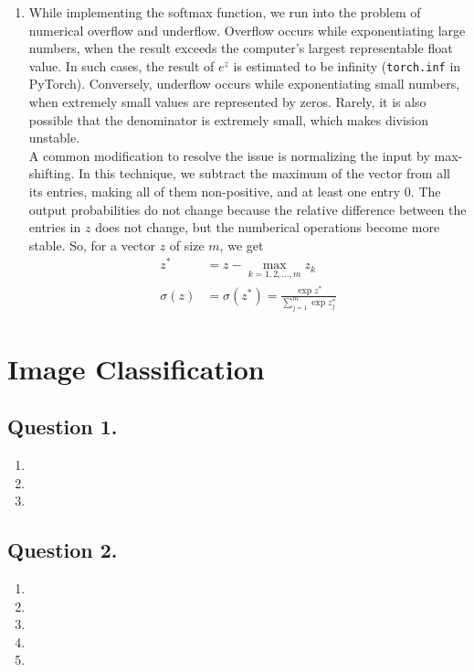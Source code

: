 \documentclass[10pt]{article}
\begin{document}
\begin{enumerate}[label=(\alph*)]
        \item While implementing the softmax function, we run into the problem of numerical overflow
        and underflow. Overflow occurs while exponentiating large numbers, when the result exceeds the
        computer's largest representable float value. In such cases, the result of $e^{z}$ is estimated to be
        infinity (\texttt{torch.inf} in PyTorch). Conversely, underflow occurs while exponentiating small
        numbers, when extremely small values are represented by zeros. Rarely, it is also possible
        that the denominator is extremely small, which makes division unstable. \\
        A common modification to resolve the issue is normalizing the input by max-shifting. In this
        technique, we subtract the maximum of the vector from all its entries, making all of them
        non-positive, and at least one entry 0. The output probabilities do not change because the relative
        difference between the entries in $z$ does not change, but the numberical
        operations become more stable. So, for a vector $z$ of size $m$, we get
        \begin{align*}
            z^{*} &= z - \max_{k = 1, 2, \dots, m}{z_{k}} \\
            \sigma(z) &= \sigma(z^{*}) = \frac{\exp{z^{*}}}{\sum_{j=1}^{m} \exp{z_{j}^{*}}}
        \end{align*}
    \end{enumerate}

    \section*{\textbf{Image Classification}}

    \subsection*{\textbf{Question 1.}}
    \begin{enumerate}[label=(\alph*)]
        \item
        \item
        \item
    \end{enumerate}

    \subsection*{\textbf{Question 2.}}
    \begin{enumerate}[label=(\alph*)]
        \item
        \item
        \item
        \item
        \item
    \end{enumerate}
\end{document}
